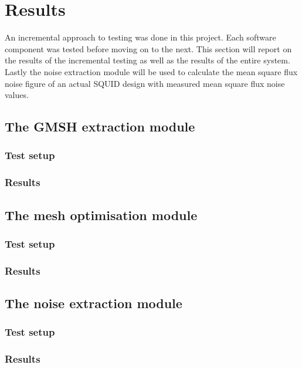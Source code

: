 \graphicspath{{results/fig/}}

\chapter{Results}
\label{chap:results}
An incremental approach to testing was done in this project. Each software component was tested before moving on to the next. This section will report on the results of the incremental testing as well as the results of the entire system. Lastly the noise extraction module will be used to calculate the mean square flux noise figure of an actual SQUID design with measured mean square flux noise values.
\section{The GMSH extraction module}

\subsection{Test setup}
\subsection{Results}

\section{The mesh optimisation module}

\subsection{Test setup}
\subsection{Results}

\section{The noise extraction module}

\subsection{Test setup}
\subsection{Results}